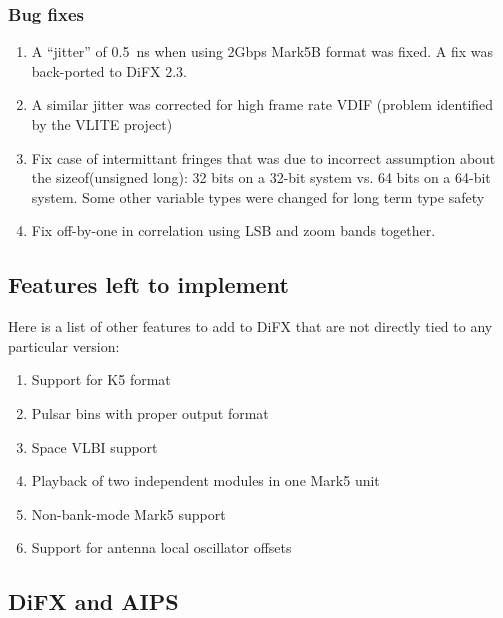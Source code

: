 \subsubsection{Bug fixes}

\begin{enumerate}

\item A ``jitter'' of 0.5~ns when using 2Gbps Mark5B format was fixed.  A fix was back-ported to DiFX 2.3.
\item A similar jitter was corrected for high frame rate VDIF (problem identified by the VLITE project)
\item Fix case of intermittant fringes that was due to incorrect assumption about the sizeof(unsigned long): 32 bits on a 32-bit system vs. 64 bits on a 64-bit system.
Some other variable types were changed for long term type safety
\item Fix off-by-one in correlation using LSB and zoom bands together.

\end{enumerate}

\subsection{Features left to implement}

Here is a list of other features to add to DiFX that are not directly tied to any particular version:
\begin{enumerate}
\item Support for K5 format
\item Pulsar bins with proper output format
\item Space VLBI support
\item Playback of two independent modules in one Mark5 unit
\item Non-bank-mode Mark5 support
\item Support for antenna local oscillator offsets
\end{enumerate}

\subsection{DiFX and AIPS}

